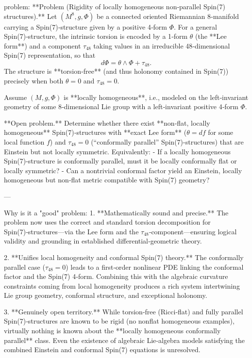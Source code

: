 problem:  
**Problem (Rigidity of locally homogeneous non‑parallel Spin(7) structures).**  
Let \((M^8, g, \Phi)\) be a connected oriented Riemannian 8‑manifold carrying a Spin(7)‑structure given by a positive 4‑form \(\Phi\).  
For a general Spin(7)‑structure, the intrinsic torsion is encoded by a 1‑form \(\theta\) (the **Lee form**) and a component \(\tau_{48}\) taking values in an irreducible 48‑dimensional Spin(7) representation, so that  
\[
d\Phi = \theta\wedge\Phi + \tau_{48}.
\]  
The structure is **torsion‑free** (and thus holonomy contained in Spin(7)) precisely when both \(\theta=0\) and \(\tau_{48}=0\).

Assume \((M,g,\Phi)\) is **locally homogeneous**, i.e., modeled on the left‑invariant geometry of some 8‑dimensional Lie group with a left‑invariant positive 4‑form \(\Phi\).

**Open problem.**  
Determine whether there exist **non‑flat, locally homogeneous** Spin(7)‑structures with **exact Lee form** (\(\theta = d f\) for some local function \(f\)) and \(\tau_{48}=0\) (“conformally parallel” Spin(7)-structures) that are Einstein but not locally symmetric.  
Equivalently:  
- If a locally homogeneous Spin(7)-structure is conformally parallel, must it be locally conformally flat or locally symmetric?  
- Can a nontrivial conformal factor yield an Einstein, locally homogeneous but non‑flat metric compatible with Spin(7) geometry?

---

Why is it a "good" problem:  
1. **Mathematically sound and precise.**  
   The problem now uses the correct and standard torsion decomposition for Spin(7)‑structures—via the Lee form and the \(\tau_{48}\)‑component—ensuring logical validity and grounding in established differential‑geometric theory.

2. **Unifies local homogeneity and conformal Spin(7) theory.**  
   The conformally parallel case (\(\tau_{48}=0\)) leads to a first‑order nonlinear PDE linking the conformal factor and the Spin(7) 4‑form. Combining this with the algebraic curvature constraints coming from local homogeneity produces a rich system intertwining Lie group geometry, conformal structure, and exceptional holonomy.

3. **Genuinely open territory.**  
   While torsion‑free (Ricci‑flat) and fully parallel Spin(7)‑structures are known to be rigid (no nonflat homogeneous examples), virtually nothing is known about the **locally homogeneous conformally parallel** class. Even the existence of algebraic Lie‑algebra models satisfying the combined Einstein and conformal Spin(7) equations is unresolved.

